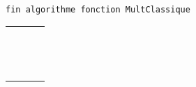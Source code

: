 \documentclass[11pt,a4paper]{article}
\begin{document}
\begin{table}[ht!]
\begin{minipage}{0.59\textwidth}
\begin{lstlisting}[style=algorithmique]
fin algorithme fonction MultClassique
 \end{lstlisting}
  \end{minipage}
  \hfillx
  \begin{minipage}{0.4\textwidth}
    \centering
    \begin{tabular}{|C{1cm}|C{1cm}|C{1cm}|C{1cm}|}
        \hline
             &     &     &     \\
        \hline
             &     &     &   \\
             &     &     &     \\
             &     &     &   \\
        \hline
             &     &     &   \\
             &     &     &     \\
             &     &     &   \\
        \hline
             &     &     &   \\
             &     &     &     \\
             &     &     &   \\
        \hline
             &     &     &   \\
             &     &     &     \\
             &     &     &   \\
        \hline
             &     &     &   \\
             &     &     &     \\
             &     &     &   \\
        \hline
    \end{tabular}
  \end{minipage}
\end{table}

\bigskip
\end{document}
